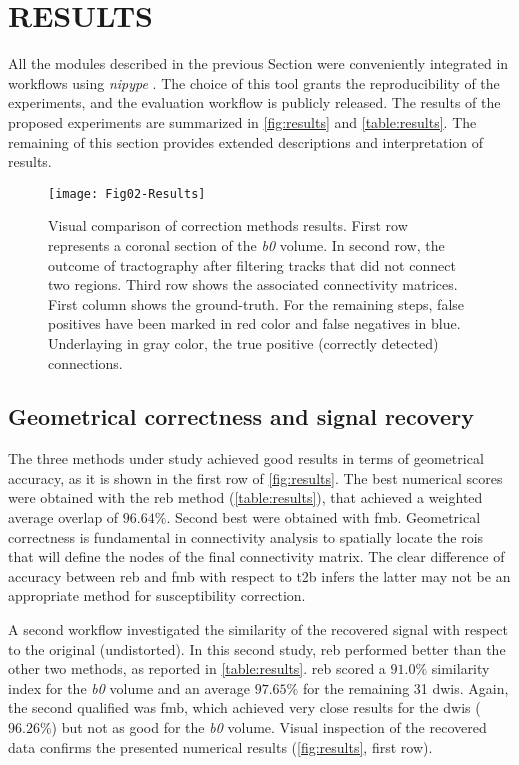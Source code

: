 \section{RESULTS}
\label{sec:results}

All the modules described in the previous Section were
conveniently integrated in workflows using \emph{nipype}
\cite{gorgolewski_nipype:_2011}. The choice of this tool
grants the reproducibility of the experiments,
and the evaluation workflow is publicly released.
The results of the proposed experiments are summarized
in \autoref{fig:results} and \autoref{table:results}.
The remaining of this section provides extended descriptions
and interpretation of results.

\begin{figure*}[tpb]
   \centering
   \texttt{[image: Fig02-Results]}
   \caption{Visual comparison of correction methods results. 
   First row represents
   a coronal section of the \textit{b0} volume. In second row, the outcome
   of tractography after filtering tracks that did not connect two regions.
   Third row shows the associated connectivity matrices. First column shows
   the ground-truth. For the remaining steps, false positives have been marked
   in red color and false negatives in blue. Underlaying in gray color,
   the true positive (correctly detected) connections. }
   \label{fig:results}
\end{figure*}


\subsection{Geometrical correctness and signal recovery}

The three methods under study achieved good results in
terms of geometrical accuracy, as it is shown in the first
row of \autoref{fig:results}. The best numerical scores
were obtained with the \gls*{reb} method (\autoref{table:results}),
that achieved a weighted average overlap of $96.64\%$. Second
best were obtained with \gls*{fmb}. Geometrical correctness
is fundamental in connectivity analysis to spatially locate the
\glspl*{roi} that will define the nodes of the final connectivity
matrix. The clear difference of accuracy between \gls*{reb} and \gls*{fmb}
with respect to \gls*{t2b} infers the latter may not be
an appropriate method for susceptibility correction.



A second workflow investigated the similarity of the recovered
signal with respect to the original (undistorted).
In this second study, \gls*{reb} performed
better than the other two methods, as reported
in \autoref{table:results}. \gls*{reb} scored a $91.0\%$
similarity index for the \textit{b0} volume and an average $97.65\%$
for the remaining 31 \glspl*{dwi}. Again, the second
qualified was \gls*{fmb}, which achieved very close results
for the \glspl*{dwi} ($96.26\%$) but not as good for the \textit{b0}
volume. Visual inspection of the recovered data confirms the 
presented numerical results (\autoref{fig:results}, first row).


